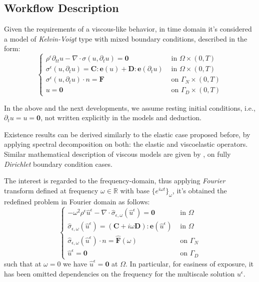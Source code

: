 \subsection{Workflow Description}
Given the requirements of a viscous-like behavior, in time domain it's considered a model of \textit{Kelvin-Voigt} type with mixed boundary conditions, described in the form:
\begin{equation*}
    \left \{
    \begin{array}{cc}
        \rho^{\epsilon}\partial_{tt}u - \nabla \cdot \sigma(u, \partial_t u) = \mathbf{0} & \text{ in }  \Omega \times (0,T)\\
        \sigma^{\epsilon}(u,\partial_t u)  = \mathbf{C}:\mathbf{e}(u) + \mathbf{D}:\mathbf{e}(\partial_t u) & \text{ in } \Omega \times (0,T) \\
        \sigma^{\epsilon}(u, \partial_t u)\cdot n = \mathbf{F} & \text{ on } \Gamma_N \times (0,T) \\ 
        u = \mathbf{0} & \text{ on } \Gamma_D \times (0,T)
    \end{array}
    \right .
    \label{ViscoElasticModel}
\end{equation*}
\begin{rem}
In the above and the next developments, we assume resting initial conditions, i.e., $\partial_t u = u = \mathbf{0}$, not written explicitly in the models and deduction.
\end{rem}
Existence results can be derived similarly to the elastic case proposed before, by applying spectral decomposition on both: the elastic and viscoelastic operators. Similar mathematical description of viscous models are given by \cite{Abdessamad2009}, \cite{Boughammoura2013} on fully \textit{Dirichlet} boundary condition cases.

The interest is regarded to the frequency-domain, thus applying \textit{Fourier} transform defined at frequency $\omega \in \mathbb{R}$ with base $\{e^{i\omega t}\}_{\omega}$, it's obtained the redefined problem in Fourier domain as follows:
\begin{equation*}
    \left \{
    \begin{array}{cc}
        -\omega^2 \rho^{\epsilon} \hat{u}^{\epsilon} - \nabla \cdot \hat{\sigma}_{\epsilon,\omega}(\hat{u}^{\epsilon}) = \mathbf{0} & \text{ in } \Omega  \\
        \hat{\sigma}_{\epsilon,\omega} (\hat{u}^{\epsilon}) = (\mathbf{C} + i\omega \mathbf{D}):\mathbf{e}(\hat{u}^{\epsilon}) & \text{ in } \Omega \\
        \hat{\sigma}_{\epsilon,\omega} (\hat{u}^{\epsilon}) \cdot n = \hat{\mathbf{F}}(\omega) & \text{ on } \Gamma_N \\
        \hat{u}^{\epsilon} = \mathbf{0} & \text{ on } \Gamma_D
    \end{array}
    \right .
\end{equation*}
such that at $\omega = 0$ we have $\hat{u}^{\epsilon}=\mathbf{0}$ at $\Omega$. In particular, for easiness of exposure, it has been omitted dependencies on the frequency for the multiscale solution $u^{\epsilon}$.\\

